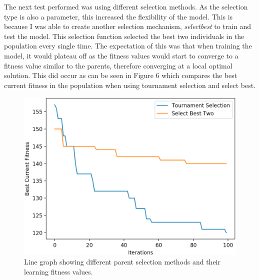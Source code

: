 \documentclass[11pt]{article}
\begin{document}
The next test performed was using different selection methods. As the selection type is also a parameter, this increased the flexibility of the model. This is because I was able to create another selection mechanism, \textit{select\textunderscore best} to train and test the model. This selection function selected the best two individuals in the population every single time. The expectation of this was that when training the model, it would plateau off as the fitness values would start to converge to a fitness value similar to the parents, therefore converging at a local optimal solution. This did occur as can be seen in Figure 6  which compares the best current fitness in the population when using tournament selection and select best. 
\begin{figure}[h]
\centering
\includegraphics[scale = .40]{learning}
\caption{Line graph showing different parent selection methods and their learning fitness values. } 
\end{figure}
\end{document}

